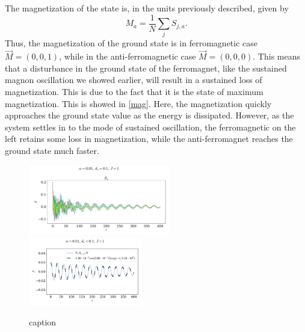 \documentclass{article}
\begin{document}
    The magnetization of the state is, in the units previously described, given by
    \begin{equation*}
        M_a = \frac{1}{N} \sum_j S_{j, a}.
    \end{equation*}
    Thus, the magnetization of the ground state is in ferromagnetic case $\vec M = (0, 0, 1)$, while in the anti-ferromagnetic case $\vec M = (0, 0, 0)$. This means that a disturbance in the ground state of the ferromagnet, like the sustained magnon oscillation we showed earlier, will result in a sustained loss of magnetization. This is due to the fact that it is the state of maximum magnetization. This is showed in \autoref{mag}. Here, the magnetization quickly approaches the ground state value as the energy is dissipated. However, as the system settles in to the mode of sustained oscillation, the ferromagnetic on the left retains some loss in magnetization, while the anti-ferromagnet reaches the ground state much faster.

    \begin{figure}[H]
        \centering
        \includegraphics[width=0.55\textwidth]{../plots/2224.pdf}
        \includegraphics[width=0.44\textwidth]{../plots/2224fit.pdf}
        \caption{caption}
        \label{one tilted dampend}
    \end{figure}
\end{document}
